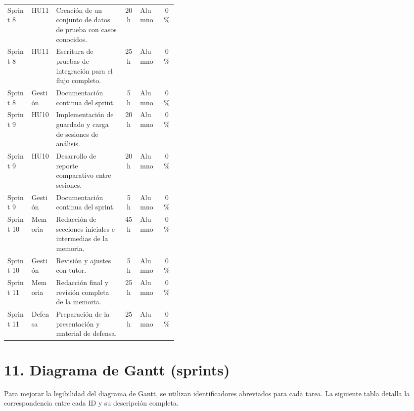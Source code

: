 \documentclass[
11pt, %
]{charter}
\begin{document}
\begin{longtable}{|l|l|p{0.4\linewidth}|c|l|c|}
Sprint 8 & HU11 & Creación de un conjunto de datos de prueba con casos conocidos. & 20 h & Alumno & 0\% \\
Sprint 8 & HU11 & Escritura de pruebas de integración para el flujo completo. & 25 h & Alumno & 0\% \\
Sprint 8 & Gestión & Documentación continua del sprint. & 5 h & Alumno & 0\% \\ \hline

Sprint 9 & HU10 & Implementación de guardado y carga de sesiones de análisis. & 20 h & Alumno & 0\% \\
Sprint 9 & HU10 & Desarrollo de reporte comparativo entre sesiones. & 20 h & Alumno & 0\% \\
Sprint 9 & Gestión & Documentación continua del sprint. & 5 h & Alumno & 0\% \\ \hline

Sprint 10 & Memoria & Redacción de secciones iniciales e intermedias de la memoria. & 45 h & Alumno & 0\% \\
Sprint 10 & Gestión & Revisión y ajustes con tutor. & 5 h & Alumno & 0\% \\ \hline

Sprint 11 & Memoria & Redacción final y revisión completa de la memoria. & 25 h & Alumno & 0\% \\
Sprint 11 & Defensa & Preparación de la presentación y material de defensa. & 25 h & Alumno & 0\% \\

\end{longtable}

\section{11. Diagrama de Gantt (sprints)}
\label{sec:gantt_sprints}

Para mejorar la legibilidad del diagrama de Gantt, se utilizan identificadores abreviados para cada tarea. La siguiente tabla detalla la correspondencia entre cada ID y su descripción completa.
\end{document}
